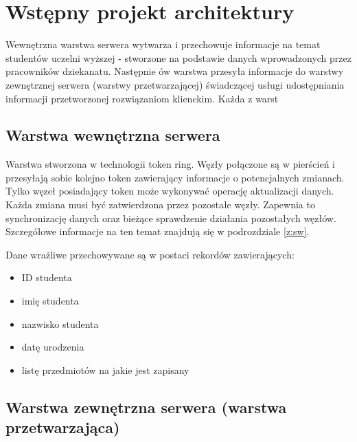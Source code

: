 \section[Wstępny projekt architektury]{Wstępny projekt architektury}

\par{Wewnętrzna warstwa serwera wytwarza i przechowuje informacje na temat studentów uczelni wyższej - stworzone na podstawie danych wprowadzonych przez pracowników dziekanatu. Następnie ów warstwa przesyła informacje do warstwy zewnętrznej serwera (warstwy przetwarzającej) świadczącej usługi udostępniania informacji przetworzonej rozwiązaniom klienckim. Każda z warst}

\subsection*[Warstwa wewnętrzna serwera]{Warstwa wewnętrzna serwera}

\par{Warstwa stworzona w technologii token ring. Węzły połączone są w pierścień i przesyłają sobie kolejno token zawierający informacje o potencjalnych zmianach. Tylko węzeł posiadający token może wykonywać operację aktualizacji danych. Każda zmiana musi być zatwierdzona przez pozostałe węzły. Zapewnia to synchronizację danych oraz bieżące sprawdzenie działania pozostałych węzłów. Szczegółowe informacje na ten temat znajdują się w podrozdziale \ref{z:sw}.}

\par{Dane wrażliwe przechowywane są w postaci rekordów zawierających:}

\begin{itemize}
\item ID studenta
\item imię studenta
\item nazwisko studenta
\item datę urodzenia
\item listę przedmiotów na jakie jest zapisany
\end{itemize}

\par{}

\subsection*[Warstwa zewnętrzna serwera]{Warstwa zewnętrzna serwera (warstwa przetwarzająca)}

\par{}

